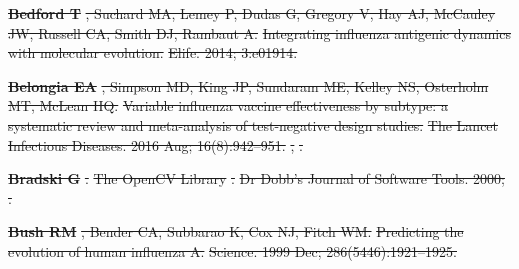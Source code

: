 \documentclass[9pt,lineno]{elife} %
\providecommand{\DIFdel}[1]{{\protect\color{red}\sout{#1}}}                      %
\providecommand{\DIFdeltex}[1]{{\protect\color{red}\sout{#1}}}                      %
\providecommand{\DIFdel}[1]{\texorpdfstring{\DIFdeltex{#1}}{}} %
\begin{document}
\textbf{%
\DIFdel{Bedford T}}%
\DIFdel{, Suchard MA, Lemey P, Dudas G,
  Gregory V, Hay AJ, McCauley JW, Russell CA, Smith DJ, Rambaut A.
}%
\DIFdel{Integrating influenza antigenic dynamics with molecular evolution.}%
\DIFdel{Elife.  2014; 3:e01914.
}%

\textbf{%
\DIFdel{Belongia EA}}%
\DIFdel{, Simpson MD, King JP, Sundaram ME,
  Kelley NS, Osterholm MT, McLean HQ.
}%
\DIFdel{Variable influenza vaccine effectiveness by subtype: a systematic
  review and meta-analysis of test-negative design studies.
}%
\DIFdel{The Lancet Infectious Diseases.  2016 Aug; 16(8):942--951.
}%
\DIFdel{,
  }%
\DIFdel{.
}%

\textbf{%
\DIFdel{Bradski G}}%
\DIFdel{.
}%
\DIFdel{The OpenCV Library}%
\DIFdel{.
}%
\DIFdel{Dr Dobb's Journal of Software Tools.  2000; .
}%

\textbf{%
\DIFdel{Bush RM}}%
\DIFdel{, Bender CA, Subbarao K, Cox NJ, Fitch
  WM.
}%
\DIFdel{Predicting the evolution of human influenza A.}%
\DIFdel{Science.  1999 Dec; 286(5446):1921--1925.
}%
\end{document}
